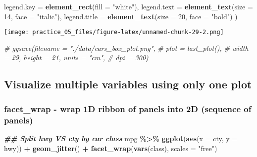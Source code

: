 \documentclass[
]{article}
\newenvironment{Shaded}{\begin{snugshade}}{\end{snugshade}}
\newcommand{\AttributeTok}[1]{\textcolor[rgb]{0.13,0.29,0.53}{#1}}
\newcommand{\CommentTok}[1]{\textcolor[rgb]{0.56,0.35,0.01}{\textit{#1}}}
\newcommand{\DecValTok}[1]{\textcolor[rgb]{0.00,0.00,0.81}{#1}}
\newcommand{\DocumentationTok}[1]{\textcolor[rgb]{0.56,0.35,0.01}{\textbf{\textit{#1}}}}
\newcommand{\FunctionTok}[1]{\textcolor[rgb]{0.13,0.29,0.53}{\textbf{#1}}}
\newcommand{\NormalTok}[1]{#1}
\newcommand{\SpecialCharTok}[1]{\textcolor[rgb]{0.81,0.36,0.00}{\textbf{#1}}}
\newcommand{\StringTok}[1]{\textcolor[rgb]{0.31,0.60,0.02}{#1}}
\begin{document}
\begin{Shaded}
\begin{Highlighting}[]
        \AttributeTok{legend.key =} \FunctionTok{element\_rect}\NormalTok{(}\AttributeTok{fill =} \StringTok{"white"}\NormalTok{),}
        \AttributeTok{legend.text =} \FunctionTok{element\_text}\NormalTok{(}\AttributeTok{size =} \DecValTok{14}\NormalTok{, }
                                   \AttributeTok{face =} \StringTok{"italic"}\NormalTok{),}
        \AttributeTok{legend.title =} \FunctionTok{element\_text}\NormalTok{(}\AttributeTok{size =} \DecValTok{20}\NormalTok{, }
                                    \AttributeTok{face =} \StringTok{"bold"}\NormalTok{)}
\NormalTok{        )}
\end{Highlighting}
\end{Shaded}

\texttt{[image: practice\_05\_files/figure-latex/unnamed-chunk-29-2.png]}

\begin{Shaded}
\begin{Highlighting}[]
\CommentTok{\# ggsave(filename = "./data/cars\_box\_plot.png", }
\CommentTok{\#        plot = last\_plot(), }
\CommentTok{\#        width = 29, height = 21, units = "cm", }
\CommentTok{\#        dpi = 300)}
\end{Highlighting}
\end{Shaded}

\subsection{Visualize multiple variables using only one
plot}\label{visualize-multiple-variables-using-only-one-plot}

\subsubsection{facet\_wrap - wrap 1D ribbon of panels into 2D (sequence
of
panels)}\label{facet_wrap---wrap-1d-ribbon-of-panels-into-2d-sequence-of-panels}

\begin{Shaded}
\begin{Highlighting}[]
\DocumentationTok{\#\# Split hwy VS cty by car class}
\NormalTok{mpg }\SpecialCharTok{\%\textgreater{}\%} 
  \FunctionTok{ggplot}\NormalTok{(}\FunctionTok{aes}\NormalTok{(}\AttributeTok{x =}\NormalTok{ cty,}
             \AttributeTok{y =}\NormalTok{ hwy)) }\SpecialCharTok{+}
  \FunctionTok{geom\_jitter}\NormalTok{() }\SpecialCharTok{+}
  \FunctionTok{facet\_wrap}\NormalTok{(}\FunctionTok{vars}\NormalTok{(class),}
             \AttributeTok{scales =} \StringTok{"free"}\NormalTok{)}
\end{Highlighting}
\end{Shaded}
\end{document}
